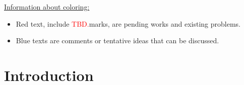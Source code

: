 \documentclass[twoside,12pt,a4paper]{article}
\numberwithin{equation}{section}
\newcommand\TBD{\textcolor{red}{TBD.}}
\begin{document}
	\maketitle
	
	\setcounter{page}{1} 
	
	\begin{abstract}
		This document is an outline of the article for the Scaling limit of SIRW. We complete the functional CLT in \cite{KMP22} for the asymptotically free self-interacting random walk (AF-SIRW) in the case $0<p \leq \frac{1}{2}$. The approach is to carefully approximate the local drifts of the random walk via the study of the directed edge local times, which are described by branching-like processes and generalized Ray-Knight Theorems. Xiaoyu Liu and Zhe Wang are working on this project. 
		\TBD
	\end{abstract}
	
	\underline{\textsf{Information about coloring:}}
	\begin{itemize}
		\item 
		\textsf{\color{red} Red text, include \TBD marks, are pending works and existing problems.}
		\item 
		\textsf{\color{blue} Blue texts are comments or tentative ideas that can be discussed.}
	\end{itemize}
	
	
	
	\section{Introduction}
	
\end{document}
